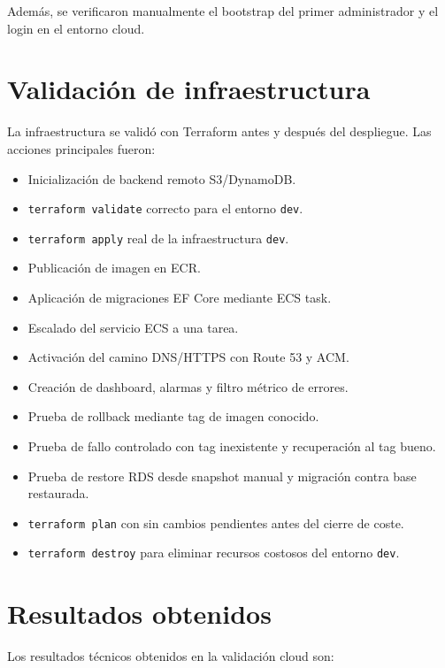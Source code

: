Además, se verificaron manualmente el bootstrap del primer administrador y el login en el entorno cloud.

\section{Validación de infraestructura}
\label{sec:validacion-infraestructura}

La infraestructura se validó con Terraform antes y después del despliegue. Las acciones principales fueron:

\begin{itemize}
  \item Inicialización de backend remoto S3/DynamoDB.
  \item \texttt{terraform validate} correcto para el entorno \texttt{dev}.
  \item \texttt{terraform apply} real de la infraestructura \texttt{dev}.
  \item Publicación de imagen en ECR.
  \item Aplicación de migraciones EF Core mediante ECS task.
  \item Escalado del servicio ECS a una tarea.
  \item Activación del camino DNS/HTTPS con Route 53 y ACM.
  \item Creación de dashboard, alarmas y filtro métrico de errores.
  \item Prueba de rollback mediante tag de imagen conocido.
  \item Prueba de fallo controlado con tag inexistente y recuperación al tag bueno.
  \item Prueba de restore RDS desde snapshot manual y migración contra base restaurada.
  \item \texttt{terraform plan} con  sin cambios pendientes antes del cierre de coste.
  \item \texttt{terraform destroy} para eliminar recursos costosos del entorno \texttt{dev}.
\end{itemize}

\section{Resultados obtenidos}
\label{sec:resultados-obtenidos}

Los resultados técnicos obtenidos en la validación cloud son:

